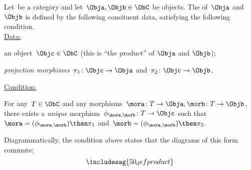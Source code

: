 \begin{ctdefinition}
  Let~\CatC be a category and let~$\Obja, \Objb \in \ObC$ be objects. The \emph{} of~$\Obja$ and~$\Objb$ is defined by the following consituent data, satisfying the following condition. \\
  \underline{Data:}
  \begin{compactenum}
    \item an object~$\Objc \in \ObC$ (this is ``the product'' of $\Obja$  and $\Objb$);
    \item \emph{projection morphisms}~$\pi_1 \colon \Objc \to \Obja$ and~$\pi_2 \colon \Objc \to \Objb$,
  \end{compactenum}
  \underline{Condition:}
  \begin{compactenum}
    \item For any~$T \in \ObC$ and any morphisms~$\mora \colon T \to \Obja, \morb \colon T \to \Objb$, there exists a \emph{unique} morphism~$\phi_{\mora,\morb} \colon T \to \Objc$ such that~$\mora = (\phi_{\mora,
      \morb})\then \pi_1$ and~$\morb=(\phi_{\mora, \morb})\then \pi_2$.
  \end{compactenum}
\end{ctdefinition}

\begin{remark}
  Diagrammatically, the condition above states that the diagrams of this form commute:
  \begin{equation}
    \includesag{50_defproduct}
  \end{equation}
\end{remark}

